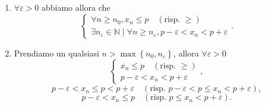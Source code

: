 \begin{demonstration}
\begin{enumerate}[label=(\roman*)]
\begin{enumerate}[label=\arabic*.]
\begin{enumerate}[label=\arabic{enumii}.\arabic*.]
                \item Prendiamo arbitrariamente $j > \max\left\{j_0, k\right\}$, allora \[
                    \begin{cases}
                        j > j_0\\
                        j > k
                    \end{cases}\]\[
                    \begin{cases}
                        x_j < x_k \\
                        x_j > x_k 
                    \end{cases}\quad\left(\text{risp.} \begin{cases}
                        x_j > x_k \\
                        x_j < x_k 
                    \end{cases}\right)\]\[
                    \text{Assurdo (risp. Assurdo)}
                \]
                \item Dunque $\nexists k \geq n_0 \mid x_k > p$ (risp. $p > x_k$).
                \item Perciò $\forall k \geq n_0 , x_k \leq p$ (risp. $p \leq x_k$).
                \item Ovvero $\forall n \geq n_0 , x_n \leq p$ (risp. $\geq$).
            \end{enumerate}
            \qed

            \item $\forall \varepsilon>0$ abbiamo allora che \[
                \begin{cases}
                    \forall n \geq n_0 , x_n \leq p \quad\left(\text{risp. } \geq\right)\\
                    \exists n_\varepsilon\in\mathbb{N} \mid \forall n\geq n_\varepsilon, p-\varepsilon <x_n< p+\varepsilon
                \end{cases}.
            \]

            \item Prendiamo un qualsiasi $n > \max\left\{n_0, n_\varepsilon\right\}$, allora $\forall \varepsilon>0$ \[
                \begin{cases}
                    x_n \leq p \quad\left(\text{risp. } \geq\right)\\
                    p-\varepsilon <x_n< p+\varepsilon
                \end{cases},\]\[
                p-\varepsilon <x_n \leq p< p+\varepsilon  \quad\left(\text{risp. } p-\varepsilon <p \leq x_n< p+\varepsilon\right),\]\[
                p-\varepsilon <x_n \leq p\quad\left(\text{risp. } p \leq x_n< p+\varepsilon\right). \]\[
            \]


\end{enumerate}
\end{enumerate}
\end{demonstration}
